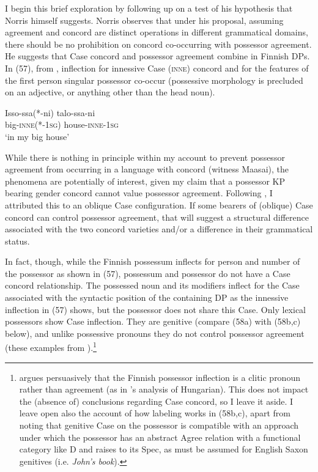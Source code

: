 \documentclass[output=paper
,modfonts
,nonflat]{langsci/langscibook}
\begin{document}
I begin this brief exploration by following up on a test of his hypothesis that Norris himself suggests. Norris observes that under his proposal, assuming agreement and concord are distinct operations in different grammatical domains, there should be no prohibition on concord co-occurring with possessor agreement. He suggests that Case concord and possessor agreement combine in Finnish DPs. In (57), from \citet[163]{Norris2014}, inflection for innessive Case (\textsc{inne}) concord and for the features of the first person singular possessor co-occur (possessive morphology is precluded on an adjective, or anything other than the head noun).

\begin{exe}
\ex
\gll Isso-ssa(*-ni)     talo-ssa-ni\\
big-\textsc{inne}(*-1\textsc{sg}) house-\textsc{inne}{}-1\textsc{sg}\\
\glt `in my big house'
\end{exe}
While there is nothing in principle within my account to prevent possessor agreement from occurring in a language with concord (witness Maasai), the phenomena are potentially of interest, given my claim that a possessor KP bearing gender concord cannot value possessor agreement. Following \citet{Toosarvandani_Van_Urk2014}, I attributed this to an oblique Case configuration. If some bearers of (oblique) Case concord can control possessor agreement, that will suggest a structural difference associated with the two concord varieties and/or a difference in their grammatical status. 

In fact, though, while the Finnish possessum inflects for person and number of the possessor as shown in (57), possessum and possessor do not have a Case concord relationship. The possessed noun and its modifiers inflect for the Case associated with the syntactic position of the containing DP as the innessive inflection in (57) shows, but the possessor does not share this Case. Only lexical possessors show Case inflection. They are genitive (compare (58a) with (58b,c) below), and unlike possessive pronouns they do not control possessor agreement (these examples from \citealt[582-583]{Toivonen2000}).\footnote{\citet{Toivonen2000} argues persuasively that the Finnish possessor inflection is a clitic pronoun rather than agreement (as in \citealt{Den_Dikken2015}'s analysis of Hungarian). This does not impact the (absence of) conclusions regarding Case concord, so I leave it aside. I leave open also the account of how labeling works in (58b,c), apart from noting that genitive Case on the possessor is compatible with an approach under which the possessor has an abstract Agree relation with a functional category like D and raises to its Spec, as must be assumed for English Saxon genitives (i.e. \textit{John's book}).}    
\end{document}
